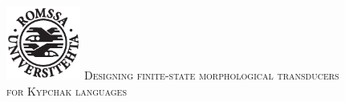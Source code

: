 \documentclass[fontscale=0.3,landscape,paperwidth=72in,paperheight=36in]{baposter}  %
\begin{document}
\begin{poster}
{				\hspace{1cm}\includegraphics[height=6.5em]{uitlogo}
		}{
			{\vspace{0pt}\hspace{1cm}
			{\titlefont \textsc{Designing finite-state morphological transducers\\for Kypchak languages}}}
		}{

}
\end{poster}
\end{document}
